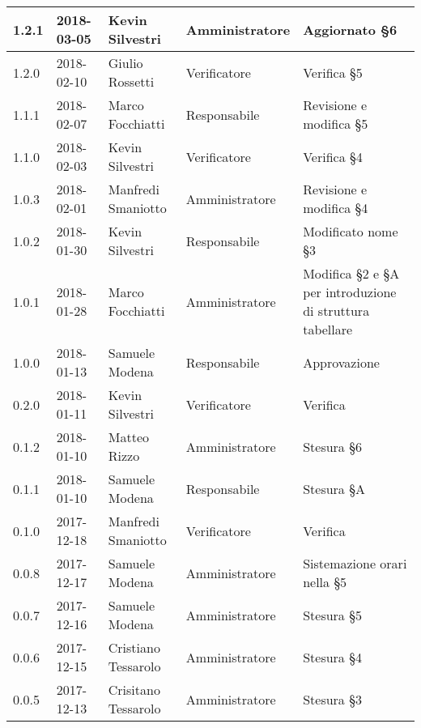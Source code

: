 \documentclass[./PianodiProgetto.tex]{subfiles}
\begin{document}
\begin{longtable}{|p{20mm}|p{20mm}|p{40mm}|p{30mm}|p{50mm}|}
		\hline 1.2.1 & 2018-03-05 & Kevin Silvestri & Amministratore & Aggiornato §6 \\
		
		\hline 1.2.0 & 2018-02-10 & Giulio Rossetti & Verificatore & Verifica §5 \\
		
		\hline 1.1.1 & 2018-02-07 & Marco Focchiatti & Responsabile & Revisione e modifica §5 \\
		
		\hline 1.1.0 & 2018-02-03 & Kevin Silvestri & Verificatore & Verifica §4 \\
				
		\hline 1.0.3 & 2018-02-01 & Manfredi Smaniotto & Amministratore & Revisione e modifica §4 \\
		
		\hline 1.0.2 & 2018-01-30 & Kevin Silvestri & Responsabile & Modificato nome §3 \\
		
		\hline 1.0.1 & 2018-01-28 & Marco Focchiatti & Amministratore & Modifica §2 e §A per introduzione di struttura tabellare \\
	
		\hline 1.0.0 & 2018-01-13 & Samuele Modena & Responsabile & Approvazione \\
 
		\hline 0.2.0 & 2018-01-11 & Kevin Silvestri & Verificatore & Verifica \\
 
		\hline 0.1.2 & 2018-01-10 & Matteo Rizzo & Amministratore & Stesura §6 \\
 
		\hline 0.1.1 & 2018-01-10 & Samuele Modena & Responsabile & Stesura §A \\
 
		\hline 0.1.0 & 2017-12-18 & Manfredi Smaniotto & Verificatore & Verifica \\
 		
 		\hline 0.0.8 & 2017-12-17 & Samuele Modena & Amministratore & Sistemazione orari nella §5 \\
 		
		\hline 0.0.7 & 2017-12-16 & Samuele Modena & Amministratore & Stesura §5 \\
 
		\hline 0.0.6 & 2017-12-15 & Cristiano Tessarolo & Amministratore & Stesura §4 \\
 
		\hline 0.0.5 & 2017-12-13 & Crisitano Tessarolo & Amministratore & Stesura §3 \\
 

\end{longtable}
\end{document}
